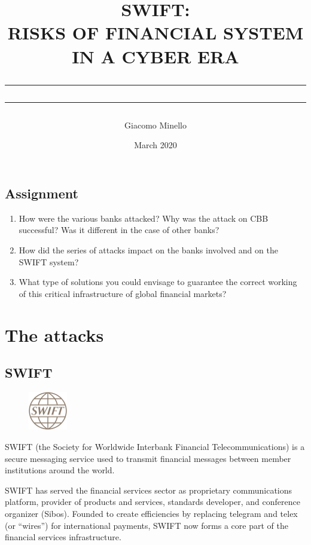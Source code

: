 \documentclass[12pt]{article}
\title{SWIFT: \\
RISKS OF FINANCIAL SYSTEM IN A CYBER ERA\\
\textcolor{red}{\rule[0.1cm]{13cm}{0.1mm}}
\rule[0.5cm]{13.5cm}{0.6mm}}
\author{Giacomo Minello}
\date{March 2020}
\begin{document}
\begin{titlepage}
\maketitle
\section*{Assignment}
\begin{enumerate}
    \item How were the various banks attacked? Why was the attack on CBB successful? Was it different in the case of other banks?
    \item How did the series of attacks impact on the banks involved and on the SWIFT system?
    \item What type of solutions you could envisage to guarantee the correct working of this critical infrastructure of global financial markets?
\end{enumerate}

\end{titlepage}

\tableofcontents



\newpage

\listoffigures
\listoftables

\newpage
{}
\section{The attacks}
    \subsection{SWIFT}
    \begin{figure}
    \centering
    \includegraphics[width=0.15\textwidth]{figures/swiftlogo.png}
    \end{figure}
        
        SWIFT (the Society for Worldwide Interbank Financial Telecommunications) is a secure messaging service used to transmit financial messages between member institutions around the world. 
        
        SWIFT has served the financial services sector as proprietary communications platform, provider of products and services, standards developer, and conference organizer (Sibos). Founded to create efficiencies by replacing telegram and telex (or “wires”) for international payments, SWIFT now forms a core part of the financial services infrastructure.
    
\end{document}
